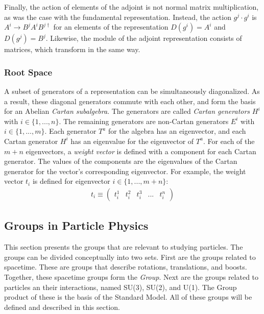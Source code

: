 Finally, the action of elements of the adjoint is not normal matrix multiplication, as was the case with the fundamental representation.
Instead, the action $g^j\cdot g^i$ is $A^i\to B^jA^iB^{j\dagger}$ for an elements of the representation $D(g^i)=A^i$ and $D(g^j)=B^j$. \check
Likewise, the module of the adjoint representation consists of \nxn matrices, which transform in the same way.

\subsubsection{Root Space}
A subset of generators of a representation can be simultaneously diagonalized.
As a result, these diagonal generators commute with each other, and form the basis for an Abelian \emph{Cartan subalgebra}.
The generators are called \emph{Cartan generators} $H^i$ with $i\in\{1,...,n\}$.
The remaining generators are non-Cartan generators $E^i$ with $i\in\{1,...,m\}$.
Each generator $T^a$ for the algebra has an eigenvector, and each Cartan generator $H^i$ has an eigenvalue for the eigenvector of $T^a$.
For each of the $m+n$ eigenvectors, a \emph{weight vector} is defined with a component for each Cartan generator.
The values of the components are the eigenvalues of the Cartan generator for the vector's corresponding eigenvector.
For example, the weight vector $t_i$ is defined for eigenvector $i\in\{1,...,m+n\}$:
\begin{equation}\begin{split}
t_i\equiv \begin{pmatrix}t_i^1&t_i^2&t_i^3&...&t_i^{n}\end{pmatrix}
\end{split}\end{equation} 

\subsection{Groups in Particle Physics}

This section presents the groups that are relevant to studying particles.
The groups can be divided conceptually into two sets.
First are the groups related to spacetime.
These are groups that describe rotations, translations, and boosts.
Together, these spacetime groups form the \emph{\poincare Group}.
Next are the groups related to particles an their interactions, named SU(3), SU(2), and U(1).
The Group product of these is the basis of the Standard Model.
All of these groups will be defined and described in this section.

